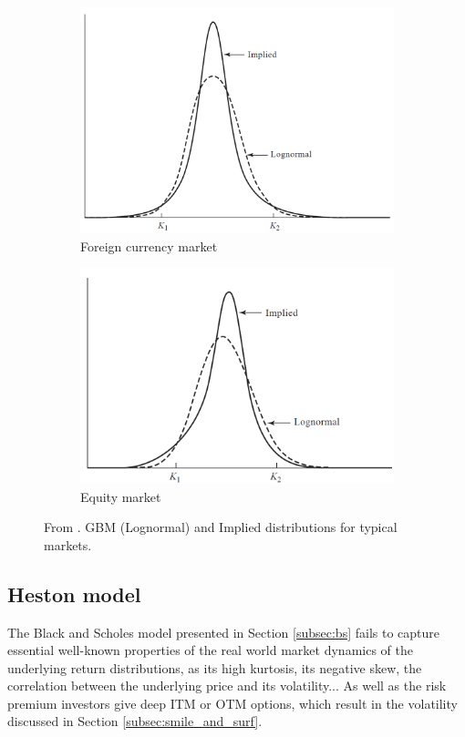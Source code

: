\documentclass[12,twoside]{mammeTFM}
\theoremstyle{definition}
\theoremstyle{remark}
\begin{document}
\begin{figure}
\centering
\begin{subfigure}{.5\textwidth}
  \centering
  \includegraphics[width=.8\linewidth]{Media/currency_distribution.PNG}
  \caption{Foreign currency market}
\end{subfigure}%
\begin{subfigure}{.5\textwidth}
  \centering
  \includegraphics[width=.9\linewidth]{Media/equity_distribution.PNG}
  \caption{Equity market}
\end{subfigure}
\caption{From \cite{hul09}. GBM (Lognormal) and Implied distributions for typical markets.}
\label{fig:implied_distribution}
\end{figure}

\subsection{Heston model} \label{chap:heston_model}

The Black and Scholes model presented in Section \ref{subsec:bs} fails to capture essential well-known properties of the real world market dynamics of the underlying return distributions, as its high kurtosis, its negative skew, the correlation between the underlying price and its volatility... As well as the risk premium investors give deep ITM or OTM options, which result in the volatility discussed in Section \ref{subsec:smile_and_surf}.
\end{document}
